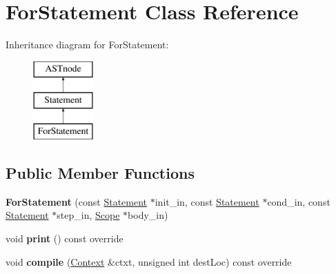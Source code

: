 \hypertarget{class_for_statement}{}\section{For\+Statement Class Reference}
\label{class_for_statement}
Inheritance diagram for For\+Statement\+:\begin{figure}[H]
\begin{center}
\leavevmode
\includegraphics[height=3.000000cm]{class_for_statement}
\end{center}
\end{figure}
\subsection*{Public Member Functions}
\begin{DoxyCompactItemize}
\item 
\mbox{\label{class_for_statement_ae97d7b04d1286c2526afea1334ed3b5c}} 
{\bfseries For\+Statement} (const \hyperlink{class_statement}{Statement} $\ast$init\+\_\+in, const \hyperlink{class_statement}{Statement} $\ast$cond\+\_\+in, const \hyperlink{class_statement}{Statement} $\ast$step\+\_\+in, \hyperlink{class_scope}{Scope} $\ast$body\+\_\+in)
\item 
\mbox{\label{class_for_statement_a4cd6e716523339630163e9ed6a40d871}} 
void {\bfseries print} () const override
\item 
\mbox{\label{class_for_statement_affb13212c8806cf22daf04881f488511}} 
void {\bfseries compile} (\hyperlink{class_context}{Context} \&ctxt, unsigned int dest\+Loc) const override
\end{DoxyCompactItemize}

